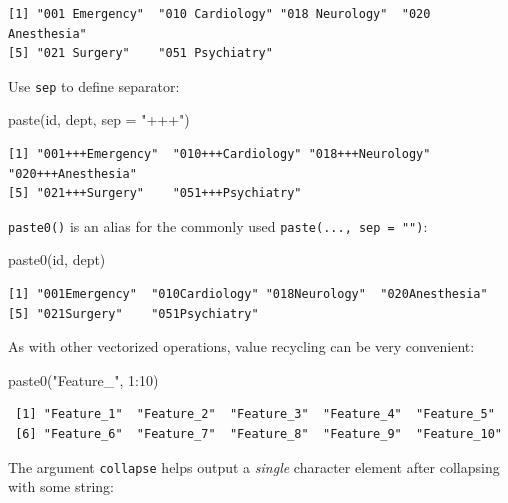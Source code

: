 \documentclass[
]{book}
\newenvironment{Shaded}{\begin{snugshade}}{\end{snugshade}}
\newcommand{\AttributeTok}[1]{\textcolor[rgb]{0.77,0.63,0.00}{#1}}
\newcommand{\DecValTok}[1]{\textcolor[rgb]{0.00,0.00,0.81}{#1}}
\newcommand{\FunctionTok}[1]{\textcolor[rgb]{0.00,0.00,0.00}{#1}}
\newcommand{\NormalTok}[1]{#1}
\newcommand{\SpecialCharTok}[1]{\textcolor[rgb]{0.00,0.00,0.00}{#1}}
\newcommand{\StringTok}[1]{\textcolor[rgb]{0.31,0.60,0.02}{#1}}
\begin{document}
\begin{verbatim}
[1] "001 Emergency"  "010 Cardiology" "018 Neurology"  "020 Anesthesia"
[5] "021 Surgery"    "051 Psychiatry"
\end{verbatim}

Use \texttt{sep} to define separator:

\begin{Shaded}
\begin{Highlighting}[]
\FunctionTok{paste}\NormalTok{(id, dept, }\AttributeTok{sep =} \StringTok{"+++"}\NormalTok{)}
\end{Highlighting}
\end{Shaded}

\begin{verbatim}
[1] "001+++Emergency"  "010+++Cardiology" "018+++Neurology"  "020+++Anesthesia"
[5] "021+++Surgery"    "051+++Psychiatry"
\end{verbatim}

\texttt{paste0()} is an alias for the commonly used \texttt{paste(...,\ sep\ =\ "")}:

\begin{Shaded}
\begin{Highlighting}[]
\FunctionTok{paste0}\NormalTok{(id, dept)}
\end{Highlighting}
\end{Shaded}

\begin{verbatim}
[1] "001Emergency"  "010Cardiology" "018Neurology"  "020Anesthesia"
[5] "021Surgery"    "051Psychiatry"
\end{verbatim}

As with other vectorized operations, value recycling can be very convenient:

\begin{Shaded}
\begin{Highlighting}[]
\FunctionTok{paste0}\NormalTok{(}\StringTok{"Feature\_"}\NormalTok{, }\DecValTok{1}\SpecialCharTok{:}\DecValTok{10}\NormalTok{)}
\end{Highlighting}
\end{Shaded}

\begin{verbatim}
 [1] "Feature_1"  "Feature_2"  "Feature_3"  "Feature_4"  "Feature_5" 
 [6] "Feature_6"  "Feature_7"  "Feature_8"  "Feature_9"  "Feature_10"
\end{verbatim}

The argument \texttt{collapse} helps output a \emph{single} character element after collapsing with some string:
\end{document}
